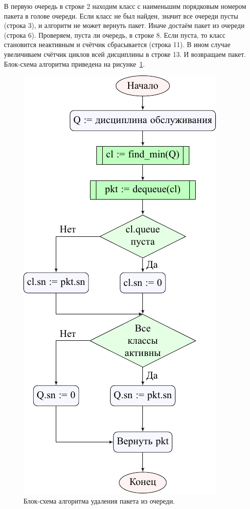 			В первую очередь в строке 2 находим класс с наименьшим порядковым номером
			пакета в голове очереди. Если класс не был найден, значит все очереди пусты (строка 3),
			и алгоритм не может вернуть пакет. Иначе достаём пакет из очереди (строка 6).
			Проверяем, пуста ли очередь, в строке 8. Если пуста, то класс
			становится неактивным и счётчик сбрасывается (строка 11). В ином случае
			увеличиваем счётчик циклов всей дисциплины в строке 13. И возвращаем
			пакет.
			Блок-схема алгоритма приведена на рисунке~\ref{pic:deqchart}.
			\newpage
            \begin{figure}[ht!]
                \center
                \includegraphics{pdfimages/deq_algo.pdf}
                \caption{Блок-схема алгоритма удаления пакета из очереди.}
        		\label{pic:deqchart}
            \end{figure}
